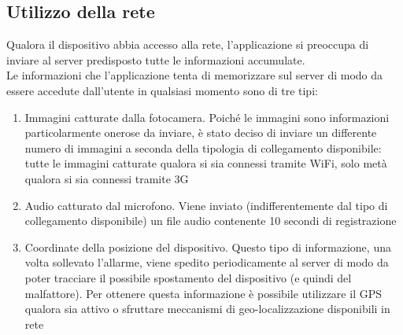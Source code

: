 \subsection{Utilizzo della rete}
Qualora il dispositivo abbia accesso alla rete, l'applicazione si preoccupa di inviare al server predisposto tutte le informazioni accumulate.\\
Le informazioni che l'applicazione tenta di memorizzare sul server di modo da essere accedute dall'utente in qualsiasi momento sono di tre tipi:
\begin{enumerate}
  \item Immagini catturate dalla fotocamera. Poiché le immagini sono informazioni particolarmente onerose da inviare, è stato deciso di inviare un differente numero di immagini a seconda della tipologia di collegamento disponibile: tutte le immagini catturate qualora si sia connessi tramite WiFi, solo metà qualora si sia connessi tramite 3G
  \item Audio catturato dal microfono. Viene inviato (indifferentemente dal tipo di collegamento disponibile) un file audio contenente 10 secondi di registrazione
  \item Coordinate della posizione del dispositivo. Questo tipo di informazione, una volta sollevato l'allarme, viene spedito periodicamente al server di modo da poter tracciare il possibile spostamento del dispositivo (e quindi del malfattore). Per ottenere questa informazione è possibile utilizzare il GPS qualora sia attivo o sfruttare meccanismi di geo-localizzazione disponibili in rete
\end{enumerate}

